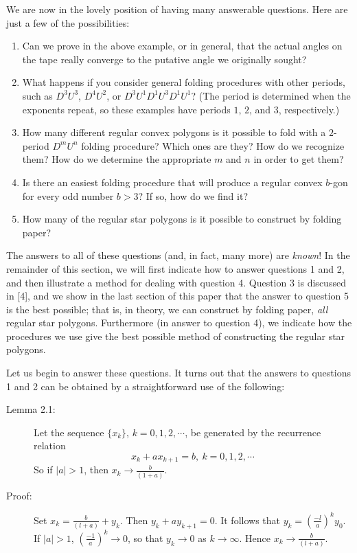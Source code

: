 We are now in the lovely position of having many answerable questions. Here are just a few of the possibilities:
\begin{enumerate}[\hspace{1cm}(1)]
  \item Can we prove in the above example, or in general, that the actual angles on the tape really converge to the putative angle we originally sought?
  \item What happens if you consider general folding procedures with other periods, such as $D^{3} U^{3}$, $D^{4} U^{2}$, or $D^{3} U^{1} D^{1} U^{3} D^{1} U^{1}$? (The period is determined when the exponents repeat, so these examples have periods $1$, $2$, and $3$, respectively.)
  \item How many different regular convex polygons is it possible to fold with a $2$-period $D^{m} U^{n}$ folding procedure? Which ones are they? How do we recognize them? How do we determine the appropriate $m$ and $n$ in order to get them?
  \item Is there an easiest folding procedure that will produce a regular convex $b$-gon for every odd number $b > 3$? If so, how do we find it?
  \item How many of the regular star polygons is it possible to construct by folding paper?
\end{enumerate}

The answers to all of these questions (and, in fact, many more) are \emph{known}! In the remainder of this section, we will first indicate how to answer questions 1 and 2, and then illustrate a method for dealing with question 4. Question 3 is discussed in [4], and we show in the last section of this paper that the answer to question 5 is the best possible; that is, in theory, we can construct by folding paper, \emph{all} regular star polygons. Furthermore (in answer to question 4), we indicate how the procedures we use give the best possible method of constructing the regular star polygons.

Let us begin to answer these questions. It turns out that the answers to questions 1 and 2 can be obtained by a straightforward use of the following:

\begin{description}

  \item[Lemma 2.1:] Let the sequence $\{ x_{k} \}$, $k = 0,1,2,\cdots$, be generated by the recurrence relation
    \begin{equation}
    x_{k} + ax_{k+1} = b,\ k = 0,1,2,\cdots  \tag{2.1}
    \end{equation}
    So if $|a| > 1$, then $x_{k} \to \frac{b}{(1+a)}$.

  \item[Proof:] Set $x_{k} = \frac{b}{(l+a)} + y_{k}$. Then $y_{k} + ay_{k+1} = 0$. It follows that $y_{k} = \left( \frac{-l}{a} \right)^{k} y_{0}$. If $|a| > 1$, $\left( \frac{-1}{a} \right)^{k} \to 0$, so that $y_{k} \to 0$ as $k \to \infty$. Hence $x_{k} \to \frac{b}{(l+a)}$.

\end{description}


